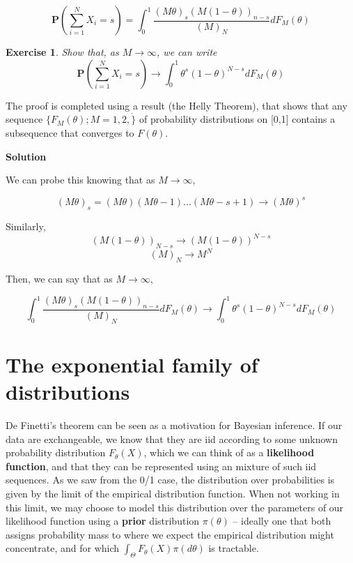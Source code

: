 \documentclass[twoside]{article}
\newcounter{lecnum}
\newtheorem{exercise}{Exercise}[lecnum]
\newcommand\Prob{\mathbf{P}}
\begin{document}
$$\Prob\left(\sum_{i=1}^N X_i = s\right) = \int_0^1\frac{(M\theta)_s(M(1-\theta))_{n-s}}{(M)_N}dF_M(\theta)$$


\begin{exercise}
  Show that, as $M\rightarrow \infty$, we can write
  $$\Prob\left(\sum_{i=1}^N X_i = s\right) \rightarrow \int_0^1\theta^s(1-\theta)^{N-s}dF_M(\theta)$$
\end{exercise}
The proof is completed using a result (the Helly Theorem), that shows that any sequence $\{F_M(\theta); M=1,2,\dot\}$ of probability distributions on [0,1] contains a subsequence that converges to $F(\theta)$.

 \color{blue}
\textbf{Solution}

We can probe this knowing that as $M\rightarrow \infty$,

$$ (M\theta)_s = (M\theta)(M\theta-1)...(M\theta-s+1) \rightarrow (M\theta)^s $$

Similarly, 
$$ (M(1-\theta))_{N-s} \rightarrow  (M(1-\theta))^{N-s} $$
$$ (M)_{N} \rightarrow  M^{N}  $$

Then, we can say that as $M\rightarrow \infty$,

$$  \int_0^1\frac{(M\theta)_s(M(1-\theta))_{n-s}}{(M)_N}dF_M(\theta) \rightarrow 
\int_0^1\theta^s(1-\theta)^{N-s}dF_M(\theta)
 $$

 \color{black}
\newpage
  

\section{The exponential family of distributions}

De Finetti's theorem can be seen as a motivation for Bayesian inference. If our data are exchangeable, we know that they are iid according to some unknown probability distribution $F_\theta(X)$, which we can think of as a \textbf{likelihood function}, and that they can be represented using an mixture of such iid sequences. As we saw from the 0/1 case, the distribution over probabilities is given by the limit of the empirical distribution function. When not working in this limit, we may choose to model this distribution over the parameters of our likelihood function using a \textbf{prior} distribution $\pi(\theta)$ -- ideally one that both assigns probability mass to where we expect the empirical distribution might concentrate, and for which $\int_\Theta F_\theta(X) \pi(d\theta)$ is tractable.
\end{document}
